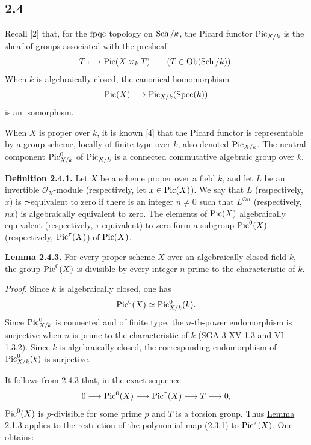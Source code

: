 \subsection*{2.4}
Recall [2] that, for the $\mathrm{fpqc}$ topology on $\operatorname{Sch}/k$, the Picard functor
$\operatorname{Pic}_{X/k}$ is the sheaf of groups associated with the presheaf
\[
T\longmapsto\operatorname{Pic}(X\times_kT)
\qquad(T\in\operatorname{Ob}(\operatorname{Sch}/k)).
\]
When $k$ is algebraically closed, the canonical homomorphism
\[
\operatorname{Pic}(X)\longrightarrow\operatorname{Pic}_{X/k}(\operatorname{Spec}(k))
\]
is an isomorphism.

When $X$ is proper over $k$, it is known [4] that the Picard functor is
representable by a group scheme, locally of finite type over $k$, also denoted
$\operatorname{Pic}_{X/k}$. The neutral component $\operatorname{Pic}^0_{X/k}$ of $\operatorname{Pic}_{X/k}$ is a
connected commutative algebraic group over $k$.

\textbf{Definition 2.4.1.}
Let $X$ be a scheme proper over a field $k$, and let $L$ be an invertible
$\mathcal O_X$-module (respectively, let $x\in\operatorname{Pic}(X)$). We say that $L$
(respectively, $x$) is $\tau$-equivalent to zero if there is an integer
$n\ne0$ such that $L^{\otimes n}$ (respectively, $nx$) is algebraically
equivalent to zero. The elements of $\operatorname{Pic}(X)$ algebraically equivalent
(respectively, $\tau$-equivalent) to zero form a subgroup $\operatorname{Pic}^0(X)$
(respectively, $\operatorname{Pic}^\tau(X)$) of $\operatorname{Pic}(X)$.

\textbf{Lemma 2.4.3.}
For every proper scheme $X$ over an algebraically closed field $k$, the group
$\operatorname{Pic}^0(X)$ is divisible by every integer $n$ prime to the characteristic of
$k$.

\emph{Proof.}
Since $k$ is algebraically closed, one has
\[
\operatorname{Pic}^0(X)\simeq\operatorname{Pic}^0_{X/k}(k).
\]
Since $\operatorname{Pic}^0_{X/k}$ is connected and of finite type, the $n$-th-power
endomorphism is surjective when $n$ is prime to the characteristic of $k$
(SGA 3 XV 1.3 and VI 1.3.2). Since $k$ is algebraically closed, the
corresponding endomorphism of $\operatorname{Pic}^0_{X/k}(k)$ is surjective.

It follows from \hyperlink{sga6.e10.lem.2-4-3}{2.4.3} that, in the exact sequence
\[
0\longrightarrow\operatorname{Pic}^0(X)\longrightarrow\operatorname{Pic}^\tau(X)
\longrightarrow T\longrightarrow0,
\]
$\operatorname{Pic}^0(X)$ is $p$-divisible for some prime $p$ and $T$ is a torsion group.
Thus \hyperlink{sga6.e10.lem.2-1-3}{Lemma 2.1.3} applies to the restriction of the polynomial map \hyperlink{sga6.e10.prop.2-3-1}{(2.3.1)} to
$\operatorname{Pic}^\tau(X)$. One obtains:


